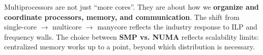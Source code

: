 \highspace
Multiprocessors are not just ``more cores''. They are about how we \textbf{organize and coordinate processors, memory, and communication}. The shift from single-core $\rightarrow$ multicore $\rightarrow$ manycore reflects the industry response to ILP and frequency walls. The choice between \textbf{SMP vs. NUMA} reflects scalability limits: centralized memory works up to a point, beyond which distribution is necessary.